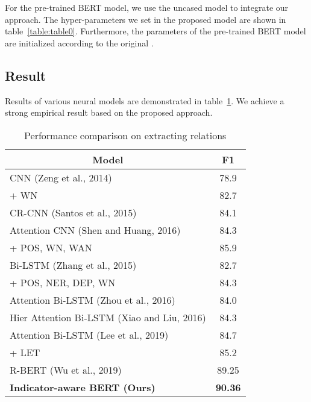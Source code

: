 \documentclass[conference]{IEEEtran}
\begin{document}
For the pre-trained BERT model, we use the uncased model to integrate our approach. The hyper-parameters we set in the proposed model are shown in table~\ref{table:table0}. Furthermore, the parameters of the pre-trained BERT model are initialized according to the original \cite{devlin2019bert}.

\subsection{Result}

Results of various neural models are demonstrated in table~\ref{table:table1}. We achieve a strong empirical result based on the proposed approach.

\begin{table}[ht]
\renewcommand\arraystretch{1.5}
\caption{Performance comparison on extracting relations}
\begin{center}
\begin{tabular}{|l|c|}
\hline
\multicolumn{1}{|c|}{\textbf{Model}}    & \multicolumn{1}{|c|}{\textbf{F1}}    \\ \hline
 CNN (Zeng et al., 2014) \cite{zeng2014relation}                             & 78.9           \\
                                                             + WN                     & 82.7           \\ \hline 
CR-CNN (Santos et al., 2015)\cite{dos2015classifying}                                     & 84.1           \\ \hline 
 Attention CNN (Shen and Huang, 2016) \cite{huang2016attention}                     & 84.3       \\
                                            + POS, WN, WAN                             & 85.9           \\ \hline
 Bi-LSTM (Zhang et al., 2015) \cite{zhang2015relation}                                       & 82.7           \\
                                                  + POS, NER, DEP, WN            & 84.3           \\ \hline
 Attention Bi-LSTM (Zhou et al., 2016) \cite{zhou2016attention}                         & 84.0           \\ \hline
Hier Attention Bi-LSTM (Xiao and Liu, 2016) \cite{xiao2016semantic}                       & 84.3           \\ \hline 
Attention Bi-LSTM (Lee et al., 2019) \cite{lee2019semantic}                     & 84.7           \\
                                + LET                                      & 85.2           \\ \hline
 R-BERT (Wu et al., 2019) \cite{wu2019enriching}                                              & 89.25          \\ \hline 
 \textbf{Indicator-aware BERT (Ours)}                                   & \textbf{90.36} \\ \hline
\end{tabular}
\label{table:table1}
\end{center}
\end{table}
\end{document}
